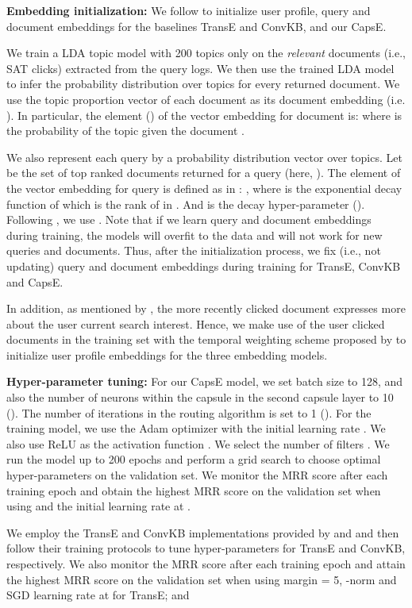 \documentclass[11pt,a4paper]{article}
\begin{document}
\noindent\textbf{Embedding initialization:} We follow \citet{vu2017search}  to initialize user profile, query and document embeddings for the baselines TransE and ConvKB, and our CapsE.

We train a LDA topic model \citep{Blei2003} with 200 topics only on the \textit{relevant} documents (i.e., SAT clicks) extracted from the query logs. We then use the trained LDA model to infer the probability distribution over topics for every returned document. We use the topic proportion vector of each document as its document embedding (i.e. ). In particular, the  element () of the vector embedding for document  is:  where  is the probability of the topic  given the document . 

We also represent each query by a probability distribution vector over topics. 
Let  be the set of top  ranked documents returned for a query  (here, ). The  element of the vector embedding for query  is  defined as in \citep{vu2017search}: , where  is the exponential decay function of  which is the rank of  in . And  is the decay hyper-parameter (). Following \citet{vu2017search}, we use .
Note that if we learn query and document embeddings during training, the models will overfit to the data and will not work for new queries and documents. 
Thus, after the initialization process, we fix (i.e., not updating) query and document embeddings during training for TransE, ConvKB and CapsE.

In addition, as mentioned by \citet{Bennett2012}, the more recently clicked document expresses more about the user current search interest. Hence, we make use of the user clicked documents in the training set with the temporal weighting scheme proposed by \citet{Vu2015} to initialize user profile embeddings for the three embedding models.

\noindent\textbf{Hyper-parameter tuning:} 
For our CapsE model, we set batch size to 128, and also the number of neurons within the capsule in the second capsule layer to 10 (). The number of iterations in the routing algorithm is set to 1 ().
For the training model, we use the Adam optimizer with the initial learning rate      . We also use ReLU as the activation function . 
We select the number of filters .
We run the model up to 200 epochs and perform a grid search to choose optimal hyper-parameters on the validation set.
We monitor the MRR score after each training epoch and obtain the highest MRR score on the validation set when using  and the initial learning rate at . 

We employ the TransE and ConvKB implementations provided by \citet{NguyenNAACL2016} and \citet{Nguyen2018} and then follow their training protocols to tune hyper-parameters for TransE and ConvKB, respectively.
We also monitor the MRR score after each training epoch and attain the highest MRR score on the validation set when using 
margin = 5, -norm and SGD learning rate at  for TransE; and 
\end{document}
